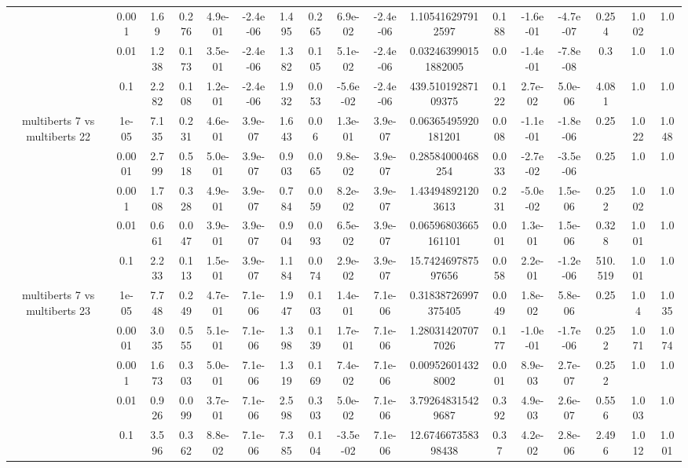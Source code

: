 \begin{tabular}{|c|c|c|c|c|c|c|c|c|c|c|c|c|c|c|c|c|}
 & 0.001 & 1.69 & 0.276 & 4.9e-01 & -2.4e-06 & 1.495 & 0.265 & 6.9e-02 & -2.4e-06 & 1.105416297912597 & 0.188 & -1.6e-01 & -4.7e-07 & 0.254 & 1.002 & 1.0 \\
 & 0.01 & 1.238 & 0.173 & 3.5e-01 & -2.4e-06 & 1.382 & 0.105 & 5.1e-02 & -2.4e-06 & 0.032463990151882005 & 0.0 & -1.4e-01 & -7.8e-08 & 0.3 & 1.0 & 1.0 \\
 & 0.1 & 2.282 & 0.108 & 1.2e-01 & -2.4e-06 & 1.932 & 0.053 & -5.6e-02 & -2.4e-06 & 439.51019287109375 & 0.122 & 2.7e-02 & 5.0e-06 & 4.081 & 1.0 & 1.0 \\
\hline
\multirow{5}{*}{multiberts 7 vs multiberts 22} & 1e-05 & 7.135 & 0.231 & 4.6e-01 & 3.9e-07 & 1.643 & 0.06 & 1.3e-01 & 3.9e-07 & 0.06365495920181201 & 0.008 & -1.1e-01 & -1.8e-06 & 0.25 & 1.022 & 1.048 \\
 & 0.0001 & 2.799 & 0.518 & 5.0e-01 & 3.9e-07 & 0.903 & 0.065 & 9.8e-02 & 3.9e-07 & 0.28584000468254 & 0.033 & -2.7e-02 & -3.5e-06 & 0.25 & 1.0 & 1.0 \\
 & 0.001 & 1.708 & 0.328 & 4.9e-01 & 3.9e-07 & 0.784 & 0.059 & 8.2e-02 & 3.9e-07 & 1.434948921203613 & 0.231 & -5.0e-02 & 1.5e-06 & 0.252 & 1.002 & 1.0 \\
 & 0.01 & 0.661 & 0.047 & 3.9e-01 & 3.9e-07 & 0.904 & 0.093 & 6.5e-02 & 3.9e-07 & 0.06596803665161101 & 0.001 & 1.3e-01 & 1.5e-06 & 0.328 & 1.001 & 1.0 \\
 & 0.1 & 2.233 & 0.113 & 1.5e-01 & 3.9e-07 & 1.184 & 0.074 & 2.9e-02 & 3.9e-07 & 15.742469787597656 & 0.058 & 2.2e-01 & -1.2e-06 & 510.519 & 1.001 & 1.0 \\
\hline
\multirow{5}{*}{multiberts 7 vs multiberts 23} & 1e-05 & 7.748 & 0.249 & 4.7e-01 & 7.1e-06 & 1.947 & 0.103 & 1.4e-01 & 7.1e-06 & 0.31838726997375405 & 0.049 & 1.8e-02 & 5.8e-06 & 0.25 & 1.04 & 1.035 \\
 & 0.0001 & 3.035 & 0.555 & 5.1e-01 & 7.1e-06 & 1.398 & 0.139 & 1.7e-01 & 7.1e-06 & 1.280314207077026 & 0.177 & -1.0e-01 & -1.7e-06 & 0.252 & 1.071 & 1.074 \\
 & 0.001 & 1.673 & 0.303 & 5.0e-01 & 7.1e-06 & 1.319 & 0.169 & 7.4e-02 & 7.1e-06 & 0.009526014328002 & 0.001 & 8.9e-03 & 2.7e-07 & 0.252 & 1.0 & 1.0 \\
 & 0.01 & 0.926 & 0.099 & 3.7e-01 & 7.1e-06 & 2.598 & 0.303 & 5.0e-02 & 7.1e-06 & 3.792648315429687 & 0.392 & 4.9e-03 & 2.6e-07 & 0.556 & 1.003 & 1.0 \\
 & 0.1 & 3.596 & 0.362 & 8.8e-02 & 7.1e-06 & 7.385 & 0.104 & -3.5e-02 & 7.1e-06 & 12.674667358398438 & 0.37 & 4.2e-02 & 2.8e-06 & 2.496 & 1.012 & 1.001 \\

\end{tabular}

